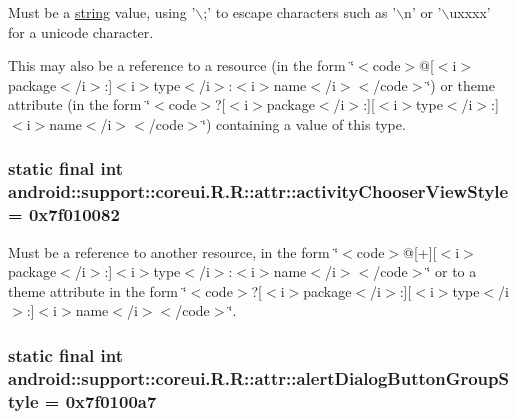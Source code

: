 Must be a \hyperlink{classandroid_1_1support_1_1coreui_1_1_r_1_1string}{string} value, using '$\backslash$;' to escape characters such as '$\backslash$n' or '$\backslash$uxxxx' for a unicode character. 

This may also be a reference to a resource (in the form \char`\"{}$<$code$>$@\mbox{[}$<$i$>$package$<$/i$>$:\mbox{]}$<$i$>$type$<$/i$>$:$<$i$>$name$<$/i$>$$<$/code$>$\char`\"{}) or theme attribute (in the form \char`\"{}$<$code$>$?\mbox{[}$<$i$>$package$<$/i$>$:\mbox{]}\mbox{[}$<$i$>$type$<$/i$>$:\mbox{]}$<$i$>$name$<$/i$>$$<$/code$>$\char`\"{}) containing a value of this type. \hypertarget{classandroid_1_1support_1_1coreui_1_1_r_1_1attr_6e800a330366d9de7c808b1c1d3305f3}{
\subsubsection[{activityChooserViewStyle}]{\setlength{\rightskip}{0pt plus 5cm}static final int android::support::coreui.R.R::attr::activityChooserViewStyle = 0x7f010082}}
\label{classandroid_1_1support_1_1coreui_1_1_r_1_1attr_6e800a330366d9de7c808b1c1d3305f3}


Must be a reference to another resource, in the form \char`\"{}$<$code$>$@\mbox{[}+\mbox{]}\mbox{[}$<$i$>$package$<$/i$>$:\mbox{]}$<$i$>$type$<$/i$>$:$<$i$>$name$<$/i$>$$<$/code$>$\char`\"{} or to a theme attribute in the form \char`\"{}$<$code$>$?\mbox{[}$<$i$>$package$<$/i$>$:\mbox{]}\mbox{[}$<$i$>$type$<$/i$>$:\mbox{]}$<$i$>$name$<$/i$>$$<$/code$>$\char`\"{}. \hypertarget{classandroid_1_1support_1_1coreui_1_1_r_1_1attr_b137eda0d9f9a76bb342eaa775150cb9}{
\subsubsection[{alertDialogButtonGroupStyle}]{\setlength{\rightskip}{0pt plus 5cm}static final int android::support::coreui.R.R::attr::alertDialogButtonGroupStyle = 0x7f0100a7}}
\label{classandroid_1_1support_1_1coreui_1_1_r_1_1attr_b137eda0d9f9a76bb342eaa775150cb9}


